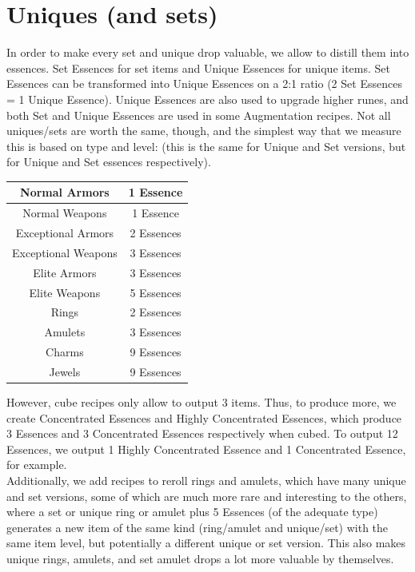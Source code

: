 \documentclass[12pt,a4paper]{article}
\begin{document}
\section{Uniques (and sets)}

In order to make every set and unique drop valuable, we allow to distill them into essences. Set Essences for set items and Unique Essences for unique items. Set Essences can be transformed into Unique Essences on a 2:1 ratio (2 Set Essences = 1 Unique Essence). Unique Essences are also used to upgrade higher runes, and both Set and Unique Essences are used in some Augmentation recipes. Not all uniques/sets are worth the same, though, and the simplest way that we measure this is based on type and level: (this is the same for Unique and Set versions, but for Unique and Set essences respectively).


\begin{tabular}{|c|c|}
\hline
Normal Armors&1 Essence\\
\hline
Normal Weapons&1 Essence\\
\hline
Exceptional Armors&2 Essences\\
\hline
Exceptional Weapons&3 Essences\\
\hline
Elite Armors&3 Essences\\
\hline
Elite Weapons&5 Essences\\
\hline
Rings&2 Essences\\
\hline
Amulets&3 Essences\\
\hline
Charms&9 Essences\\
\hline
Jewels&9 Essences\\
\hline
\end{tabular}

However, cube recipes only allow to output 3 items. Thus, to produce more, we create Concentrated Essences and Highly Concentrated Essences, which produce 3 Essences and 3 Concentrated Essences respectively when cubed. To output 12 Essences, we output 1 Highly Concentrated Essence and 1 Concentrated Essence, for example.\\


Additionally, we add recipes to reroll rings and amulets, which have many unique and set versions, some of which are much more rare and interesting to the others, where a set or unique ring or amulet plus 5 Essences (of the adequate type) generates a new item  of the same kind (ring/amulet and unique/set) with the same item level, but potentially a different unique or set  version. This also makes unique rings, amulets, and set amulet drops a lot more valuable by themselves.\\
\end{document}

